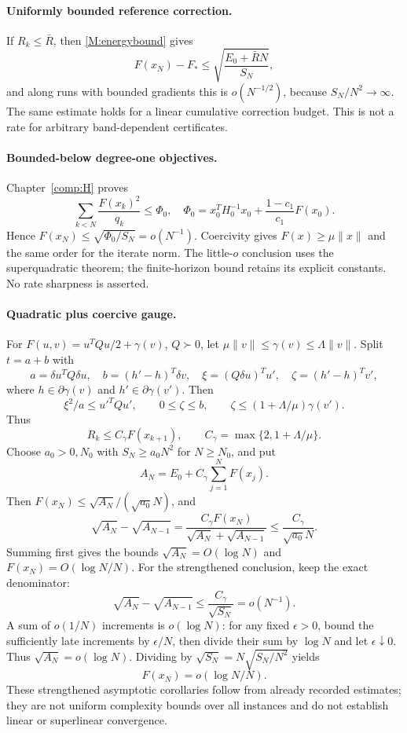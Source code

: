 \paragraph{Uniformly bounded reference correction.}
If $R_k\le\bar R$, then \eqref{M:energybound} gives
\[
 F(x_N)-F_*\le\sqrt{\frac{E_0+\bar RN}{S_N}},
\]
and along runs with bounded gradients this is $o(N^{-1/2})$, because $S_N/N^2\to\infty$. The same estimate holds for a linear cumulative correction budget. This is not a rate for arbitrary band-dependent certificates.

\paragraph{Bounded-below degree-one objectives.}
Chapter~\ref{comp:H} proves
\[
 \sum_{k<N}\frac{F(x_k)^2}{q_k}\le\Phi_0,
\quad \Phi_0=x_0^TH_0^{-1}x_0+\frac{1-c_1}{c_1}F(x_0).
\]
Hence $F(x_N)\le\sqrt{\Phi_0/S_N}=o(N^{-1})$. Coercivity gives $F(x)\ge\mu\|x\|$ and the same order for the iterate norm. The little-$o$ conclusion uses the superquadratic theorem; the finite-horizon bound retains its explicit constants. No rate sharpness is asserted.

\paragraph{Quadratic plus coercive gauge.}
For $F(u,v)=u^TQu/2+\gamma(v)$, $Q\succ0$, let $\mu\|v\|\le\gamma(v)\le\Lambda\|v\|$. Split $t=a+b$ with
\[
 a=\delta u^TQ\delta u,\quad b=(h'-h)^T\delta v,\quad
 \xi=(Q\delta u)^Tu',\quad\zeta=(h'-h)^Tv',
\]
where $h\in\partial\gamma(v)$ and $h'\in\partial\gamma(v')$. Then
\[
 \xi^2/a\le u'^TQu',\qquad0\le\zeta\le b,
 \qquad\zeta\le(1+\Lambda/\mu)\gamma(v').
\]
Thus
\[
 R_k\le C_\gamma F(x_{k+1}),\qquad
 C_\gamma=\max\{2,1+\Lambda/\mu\}.
\]
Choose $a_0>0,N_0$ with $S_N\ge a_0N^2$ for $N\ge N_0$, and put
\[
 A_N=E_0+C_\gamma\sum_{j=1}^NF(x_j).
\]
Then $F(x_N)\le\sqrt{A_N}/(\sqrt{a_0}N)$, and
\[
 \sqrt{A_N}-\sqrt{A_{N-1}}
 =\frac{C_\gamma F(x_N)}{\sqrt{A_N}+\sqrt{A_{N-1}}}
 \le\frac{C_\gamma}{\sqrt{a_0}N}.
\]
Summing first gives the bounds $\sqrt{A_N}=O(\log N)$ and $F(x_N)=O(\log N/N)$. For the strengthened conclusion, keep the exact denominator:
\[
 \sqrt{A_N}-\sqrt{A_{N-1}}\le \frac{C_\gamma}{\sqrt{S_N}}=o(N^{-1}).
\]
A sum of $o(1/N)$ increments is $o(\log N)$: for any fixed $\epsilon>0$, bound the sufficiently late increments by $\epsilon/N$, then divide their sum by $\log N$ and let $\epsilon\downarrow0$. Thus $\sqrt{A_N}=o(\log N)$. Dividing by $\sqrt{S_N}=N\sqrt{S_N/N^2}$ yields
\[
 \boxed{F(x_N)=o(\log N/N).}
\]
These strengthened asymptotic corollaries follow from already recorded estimates; they are not uniform complexity bounds over all instances and do not establish linear or superlinear convergence.

